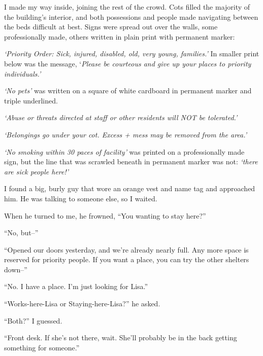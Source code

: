 I made my way inside, joining the rest of the crowd.  Cots filled the majority of the building's interior, and both possessions and people made navigating between the beds difficult at best.  Signs were spread out over the walls, some professionally made, others written in plain print with permanent marker:



\emph{`Priority Order: Sick, injured, disabled, old, very young, families.' } In smaller print below was the message, `\emph{Please be courteous and give up your places to priority individuals.'}



\emph{`No pets'} was written on a square of white cardboard in permanent marker and triple underlined.



\emph{`Abuse or threats directed at staff or other residents will NOT be tolerated.'}



\emph{`Belongings go under your cot.  Excess + mess may be removed from the area.'}



\emph{`No smoking within 30 paces of facility'} was printed on a professionally made sign, but the line that was scrawled beneath in permanent marker was not: \emph{`there are sick people here!'}



I found a big, burly guy that wore an orange vest and name tag and approached him.  He was talking to someone else, so I waited.



When he turned to me, he frowned, ``You wanting to stay here?''



``No, but--''



``Opened our doors yesterday, and we're already nearly full.  Any more space is reserved for priority people.  If you want a place, you can try the other shelters down--''



``No.  I have a place.  I'm just looking for Lisa.''



``Works-here-Lisa or Staying-here-Lisa?'' he asked.



``Both?'' I guessed.



``Front desk.  If she's not there, wait.  She'll probably be in the back getting something for someone.''



